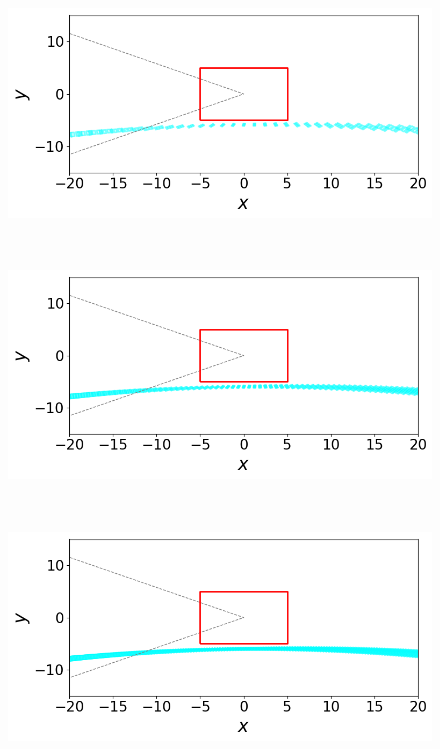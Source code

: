 \begin{figure}
\begin{minipage}[b]{\linewidth}
  \centering
  \includegraphics[width=0.9\columnwidth,trim=0 1.3em 0 0, clip]{images/step_a_1_0.png}
\end{minipage}%
\\
\vspace{1em}
\begin{minipage}[b]{\linewidth}
  \centering
    \includegraphics[width=0.9\columnwidth,trim=0 1.3em 0 0, clip]{images/step_b_0_5.png}
\end{minipage}
\\
\vspace{1em}
\begin{minipage}[b]{\linewidth}
  \centering
    \includegraphics[width=0.9\columnwidth,trim=0 1.3em 0 0, clip]{images/step_c_0_25.png}

\end{minipage}
\end{figure}
